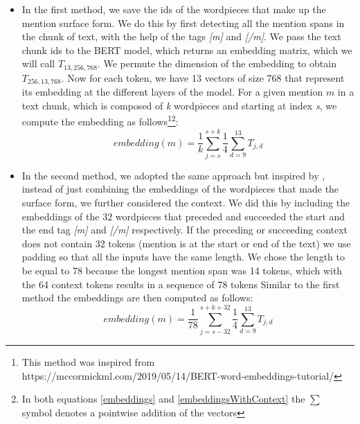 \begin{itemize}
\item{In the first method, we save the ids of the wordpieces that make up the mention surface form. We do this by first detecting all the mention spans in the chunk of text, with the help of the tags \textit{[m]} and \textit{[/m]}.\newline
We pass the text chunk ids to the BERT model, which returns an embedding matrix, which we will call $T_{13,256,768}$. We permute the dimension of the embedding to obtain $T_{256, 13, 768}$.\newline
Now for each token, we have 13 vectors of size 768 that represent its embedding at the different layers of the model.\newline
For a given mention $m$ in a text chunk, which is composed of \textit{k} wordpieces and starting at index \textit{s}, we compute the embedding as follows\footnote{This method was inspired from https://mccormickml.com/2019/05/14/BERT-word-embeddings-tutorial/}\footnote{In both equations \ref{embeddings} and \ref{embeddingsWithContext} the $\sum$ symbol denotes a pointwise addition of the vectors}}:
\begin{equation}
\label{embeddings}
embedding(m) = \dfrac{1}{k}\sum_{j=s}^{s+k} \dfrac{1}{4}\sum_{d=9}^{13}T_{j, d}
\end{equation}

\item{In the second method, we adopted the same approach but inspired by \cite{Wu2020}, instead of just combining the embeddings of the wordpieces that made the surface form, we further considered the context. We did this by including the embeddings of the 32 wordpieces that preceded and succeeded the start and the end tag  \textit{[m]} and \textit{[/m]} respectively.\newline
If the preceding or succeeding context does not contain 32 tokens (mention is at the start or end of the text) we use padding so that all the inputs have the same length. We chose the length to be equal to 78 because the longest mention span was 14 tokens, which with the 64 context tokens results in a sequence of 78 tokens\newline
Similar to the first method the embeddings are then computed as follows:
\begin{equation}
\label{embeddingsWithContext}
embedding(m) = \dfrac{1}{78}\sum_{j=s-32}^{s+k+32} \dfrac{1}{4}\sum_{d=9}^{13}T_{j, d}
\end{equation}
}
\end{itemize}

